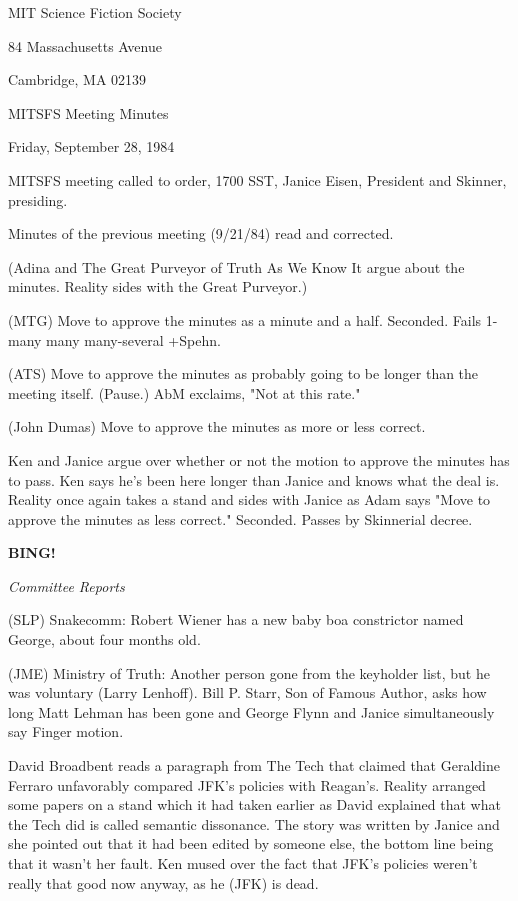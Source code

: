 \documentclass[12pt]{article}
\newcommand{\bing}{{\bf BING!} }
\newcommand{\goto}[1]{\bing \vskip 12pt \centerline{{\em{#1}}}}
\begin{document}
\begin{center}

MIT Science Fiction Society 

84 Massachusetts Avenue

Cambridge, MA 02139

\vspace{12pt}

MITSFS Meeting Minutes 

Friday, September 28, 1984

\end{center}
 
\vspace{18pt}

\setlength{\parskip}{6pt}

\noindent
MITSFS meeting called to order, 1700 SST,
Janice Eisen, President and Skinner, presiding.

Minutes of the previous meeting (9/21/84) read and corrected.

(Adina and The Great Purveyor of Truth As We Know It argue about the minutes. Reality sides with the Great Purveyor.)

(MTG) Move to approve the minutes as a minute and a half. Seconded. Fails 1-many many many-several +Spehn.

(ATS) Move to approve the minutes as probably going to be longer than the meeting itself. (Pause.) AbM exclaims, "Not at this rate."

(John Dumas) Move to approve the minutes as more or less correct.

Ken and Janice argue over whether or not the motion to approve the minutes has to pass. Ken says he's been here longer than Janice and knows what the deal is. Reality once again takes a stand and sides with Janice as Adam says "Move to approve the minutes as less correct." Seconded. Passes by Skinnerial decree.

\goto{Committee Reports}

(SLP) Snakecomm: Robert Wiener has a new baby boa constrictor named George, about four months old.

(JME) Ministry of Truth: Another person gone from the keyholder list, but he was voluntary (Larry Lenhoff). Bill P. Starr, Son of Famous Author, asks how long Matt Lehman has been gone and George Flynn and Janice simultaneously say Finger motion.

David Broadbent reads a paragraph from The Tech that claimed that Geraldine Ferraro unfavorably compared JFK's policies with Reagan's. Reality arranged some papers on a stand which it had taken earlier as David explained that what the Tech did is called semantic dissonance. The story was written by Janice and she pointed out that it had been edited by someone else, the bottom line being that it wasn't her fault. Ken mused over the fact that JFK's policies weren't really that good now anyway, as he (JFK) is dead.
\end{document}
